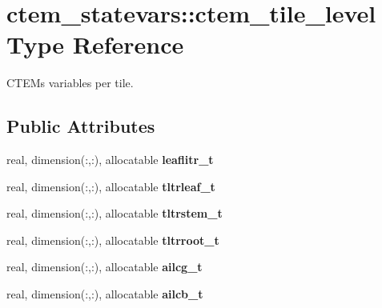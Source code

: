 \hypertarget{structctem__statevars_1_1ctem__tile__level}{}\section{ctem\+\_\+statevars\+:\+:ctem\+\_\+tile\+\_\+level Type Reference}
\label{structctem__statevars_1_1ctem__tile__level}


C\+T\+E\+M\textquotesingle{}s variables per tile.  


\subsection*{Public Attributes}
\begin{DoxyCompactItemize}
\item 
\hypertarget{structctem__statevars_1_1ctem__tile__level_a820624c4bffed15b1f4adbef38bcddc1}{}real, dimension(\+:,\+:), allocatable {\bfseries leaflitr\+\_\+t}\label{structctem__statevars_1_1ctem__tile__level_a820624c4bffed15b1f4adbef38bcddc1}

\item 
\hypertarget{structctem__statevars_1_1ctem__tile__level_ab57eca9c3d9580d941c63b2c244f96be}{}real, dimension(\+:,\+:), allocatable {\bfseries tltrleaf\+\_\+t}\label{structctem__statevars_1_1ctem__tile__level_ab57eca9c3d9580d941c63b2c244f96be}

\item 
\hypertarget{structctem__statevars_1_1ctem__tile__level_a5fdfb2babdccb1bd7a71c3679ed22417}{}real, dimension(\+:,\+:), allocatable {\bfseries tltrstem\+\_\+t}\label{structctem__statevars_1_1ctem__tile__level_a5fdfb2babdccb1bd7a71c3679ed22417}

\item 
\hypertarget{structctem__statevars_1_1ctem__tile__level_a9dd003642eebe5d98654d56cbf0dc35a}{}real, dimension(\+:,\+:), allocatable {\bfseries tltrroot\+\_\+t}\label{structctem__statevars_1_1ctem__tile__level_a9dd003642eebe5d98654d56cbf0dc35a}

\item 
\hypertarget{structctem__statevars_1_1ctem__tile__level_a8578ba380f0b95b3b71303a16eef9d83}{}real, dimension(\+:,\+:), allocatable {\bfseries ailcg\+\_\+t}\label{structctem__statevars_1_1ctem__tile__level_a8578ba380f0b95b3b71303a16eef9d83}

\item 
\hypertarget{structctem__statevars_1_1ctem__tile__level_a2e9827de8eea202e07053c7817d78fdc}{}real, dimension(\+:,\+:), allocatable {\bfseries ailcb\+\_\+t}\label{structctem__statevars_1_1ctem__tile__level_a2e9827de8eea202e07053c7817d78fdc}


\end{DoxyCompactItemize}
